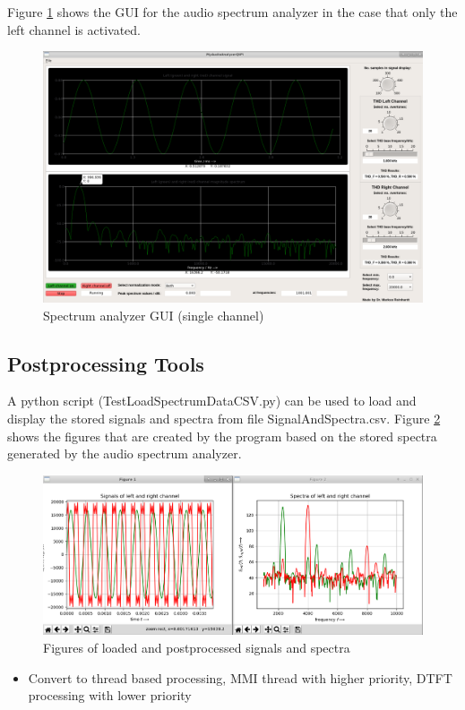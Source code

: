 \documentclass[11pt, oneside]{scrartcl}   	%
\begin{document}
Figure \ref{fig:SpectrumAnalyzerGUI2} shows the GUI for the audio spectrum analyzer in the case that only the left channel is activated.
\begin{figure}[tbph]
	\centering
	\includegraphics[width=\linewidth]{MyAudioSpectrumAnalyzerGUILeftChannel.png}
	\caption[Spectrum analyzer GUI (single channel)]{Spectrum analyzer GUI (single channel)}
	\label{fig:SpectrumAnalyzerGUI2}
\end{figure}

\subsection{Postprocessing Tools}
A python script (TestLoadSpectrumDataCSV.py) can be used to load and display the stored signals and spectra from file SignalAndSpectra.csv.
Figure \ref{fig:TestLoadSpectraCSVDisplays} shows the figures that are created by the program based on the stored spectra generated by the audio spectrum analyzer.
\begin{figure}[tbph]
	\centering
	\includegraphics[width=\linewidth]{TestLoadSpectraCSVDisplays.png}
	\caption[Figures of loaded and postprocessed signals and spectra]{Figures of loaded and postprocessed signals and spectra}
	\label{fig:TestLoadSpectraCSVDisplays}
\end{figure}

\begin{itemize}
	\item Convert to thread based processing, MMI thread with higher priority, DTFT processing with lower priority
\end{itemize}
\end{document}
